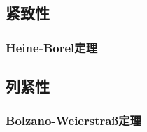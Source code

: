 \subsection{紧致性}


\subsubsection{Heine-Borel定理}


\subsection{列紧性}


\subsubsection{Bolzano-Weierstra\ss 定理}







